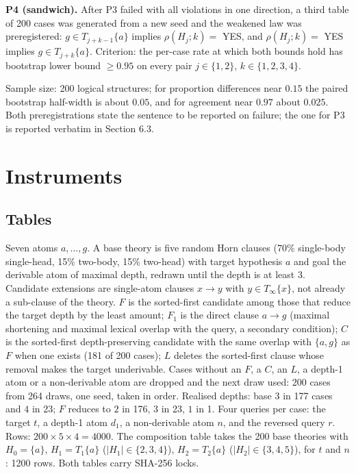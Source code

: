 \textbf{P4 (sandwich).} After P3 failed with all violations in one direction, a third table of 200 cases was generated from a new seed and the weakened law was preregistered: \(g\in T_{j+k-1}\{a\}\) implies \(\rho(H_j;k)=\) YES, and \(\rho(H_j;k)=\) YES implies \(g\in T_{j+k}\{a\}\). Criterion: the per-case rate at which both bounds hold has bootstrap lower bound \(\ge0.95\) on every pair \(j\in\{1,2\}\), \(k\in\{1,2,3,4\}\).

Sample size: 200 logical structures; for proportion differences near \(0.15\) the paired bootstrap half-width is about \(0.05\), and for agreement near \(0.97\) about \(0.025\). Both preregistrations state the sentence to be reported on failure; the one for P3 is reported verbatim in Section 6.3.

\section{Instruments}\label{instruments}

\subsection{Tables}\label{tables}

Seven atoms \(a,\dots,g\). A base theory is five random Horn clauses (70\% single-body single-head, 15\% two-body, 15\% two-head) with target hypothesis \(a\) and goal the derivable atom of maximal depth, redrawn until the depth is at least \(3\). Candidate extensions are single-atom clauses \(x\to y\) with \(y\in T_\infty\{x\}\), not already a sub-clause of the theory. \(F\) is the sorted-first candidate among those that reduce the target depth by the least amount; \(F_1\) is the direct clause \(a\to g\) (maximal shortening and maximal lexical overlap with the query, a secondary condition); \(C\) is the sorted-first depth-preserving candidate with the same overlap with \(\{a,g\}\) as \(F\) when one exists (181 of 200 cases); \(L\) deletes the sorted-first clause whose removal makes the target underivable. Cases without an \(F\), a \(C\), an \(L\), a depth-1 atom or a non-derivable atom are dropped and the next draw used: 200 cases from 264 draws, one seed, taken in order. Realised depths: base \(3\) in 177 cases and \(4\) in 23; \(F\) reduces to \(2\) in 176, \(3\) in 23, \(1\) in 1. Four queries per case: the target \(t\), a depth-1 atom \(d_1\), a non-derivable atom \(n\), and the reversed query \(r\). Rows: \(200\times5\times4=4000\). The composition table takes the 200 base theories with \(H_0=\{a\}\), \(H_1=T_1\{a\}\) (\(|H_1|\in\{2,3,4\}\)), \(H_2=T_2\{a\}\) (\(|H_2|\in\{3,4,5\}\)), for \(t\) and \(n\): 1200 rows. Both tables carry SHA-256 locks.

